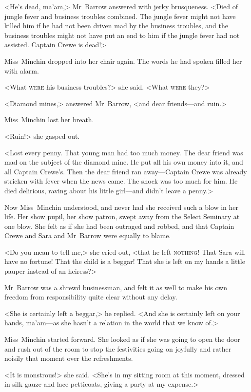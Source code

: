 <He's dead, ma'am,> Mr~Barrow answered with jerky brusqueness. <Died of jungle fever and business troubles combined. The jungle fever might not have killed him if he had not been driven mad by the business troubles, and the business troubles might not have put an end to him if the jungle fever had not assisted. Captain Crewe is dead!>

Miss~Minchin dropped into her chair again. The words he had spoken filled her with alarm.

<What \textsc{were} his business troubles?> she said. <What \textsc{were} they?>

<Diamond mines,> answered Mr~Barrow, <and dear friends—and ruin.>

Miss~Minchin lost her breath.

<Ruin!> she gasped out.

<Lost every penny. That young man had too much money. The dear friend was mad on the subject of the diamond mine. He put all his own money into it, and all Captain Crewe's. Then the dear friend ran away—Captain Crewe was already stricken with fever when the news came. The shock was too much for him. He died delirious, raving about his little girl—and didn't leave a penny.>

Now Miss~Minchin understood, and never had she received such a blow in her life. Her show pupil, her show patron, swept away from the Select Seminary at one blow. She felt as if she had been outraged and robbed, and that Captain Crewe and Sara and Mr~Barrow were equally to blame.

<Do you mean to tell me,> she cried out, <that he left \textsc{nothing}! That Sara will have no fortune! That the child is a beggar! That she is left on my hands a little pauper instead of an heiress?>

Mr~Barrow was a shrewd businessman, and felt it as well to make his own freedom from responsibility quite clear without any delay.

<She is certainly left a beggar,> he replied. <And she is certainly left on your hands, ma'am—as she hasn't a relation in the world that we know of.>

Miss~Minchin started forward. She looked as if she was going to open the door and rush out of the room to stop the festivities going on joyfully and rather noisily that moment over the refreshments.

<It is monstrous!> she said. <She's in my sitting room at this moment, dressed in silk gauze and lace petticoats, giving a party at my expense.>

